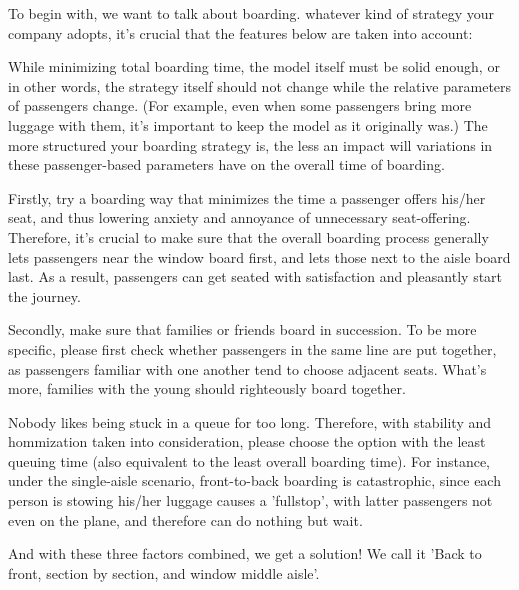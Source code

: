 \documentclass{article}
\begin{document}
	To begin with, we want to talk about boarding. whatever kind of strategy your company adopts, it's crucial that the features below are taken into account:

	\begin{itemize}

		While minimizing total boarding time, the model itself must be solid enough, or in other words, the strategy itself should not change while the relative parameters of passengers change. (For example, even when some passengers bring more luggage with them, it's important to keep the model as it originally was.) The more structured your boarding strategy is, the less an impact will variations in these passenger-based parameters have on the overall time of boarding.

		Firstly, try a boarding way that minimizes the time a passenger offers his/her seat, and thus lowering anxiety and annoyance of unnecessary seat-offering. Therefore, it's crucial to make sure that the overall boarding process generally lets passengers near the window board first, and lets those next to the aisle board last. As a result, passengers can get seated with satisfaction and pleasantly start the journey.

  		Secondly, make sure that families or friends board in succession. To be more specific, please first check whether passengers in the same line are put together, as passengers familiar with one another tend to choose adjacent seats. What's more, families with the young should righteously board together.

		Nobody likes being stuck in a queue for too long. Therefore, with stability and hommization taken into consideration, please choose the option with the least queuing time (also equivalent to the least overall boarding time). For instance, under the single-aisle scenario, front-to-back boarding is catastrophic, since each person is stowing his/her luggage causes a 'fullstop', with latter passengers not even on the plane, and therefore can do nothing but wait.

		And with these three factors combined, we get a solution! We call it 'Back to front, section by section, and window middle aisle'.


\end{itemize}
\end{document}
